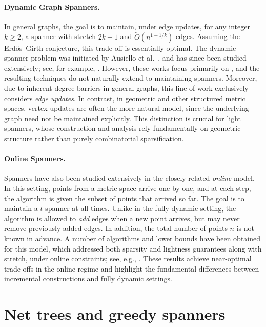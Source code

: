 \paragraph*{Dynamic Graph Spanners.}
In general graphs, the goal is to maintain, under edge updates, for any integer $k \ge 2$, a spanner with stretch $2k - 1$ and $\widetilde{O}(n^{1+1/k})$ edges. Assuming the Erd\H{o}s--Girth conjecture, this trade-off is essentially optimal. The dynamic spanner problem was initiated by Ausiello et al.~\cite{ausiello2005small}, and has since been studied extensively; see, for example,
\cite{baswana2012fully, bodwin2016fully, elkin2011streaming, bernstein2021deamortization, forster2019dynamic}.
However, these works focus primarily on , and the resulting techniques do not naturally extend to maintaining  spanners.
Moreover, due to inherent degree barriers in general graphs, this line of work exclusively considers \emph{edge updates}.
In contrast, in geometric and other structured metric spaces, vertex updates are often the more natural model, since the underlying graph need not be maintained explicitly.
This distinction is crucial for light spanners, whose construction and analysis rely fundamentally on geometric structure rather than purely combinatorial sparsification.
%
\paragraph*{Online Spanners.}
Spanners have also been studied extensively in the closely related \emph{online} model.
In this setting, points from a metric space arrive one by one, and at each step, the algorithm is given the subset of points that arrived so far.
The goal is to maintain a $t$-spanner at all times. Unlike in the fully dynamic setting, the algorithm is allowed to \emph{add} edges when a new point arrives, but may never remove previously added edges.
In addition, the total number of points $n$ is not known in advance. A number of algorithms and lower bounds have been obtained for this model, which addressed both sparsity and lightness guarantees along with stretch, under online constraints; see, e.g.,
\cite{BhoreFKT24, BhoreT25, AlonAABN06, AlonA92, BermanC97, HajiaghayiLP17, NaorPS11}.
These results achieve near-optimal trade-offs in the online regime and highlight the fundamental differences between incremental constructions and fully dynamic settings. 
%
%
%
\section{Net trees and greedy spanners}\label{sec:NetTreesGreedySpanner}
